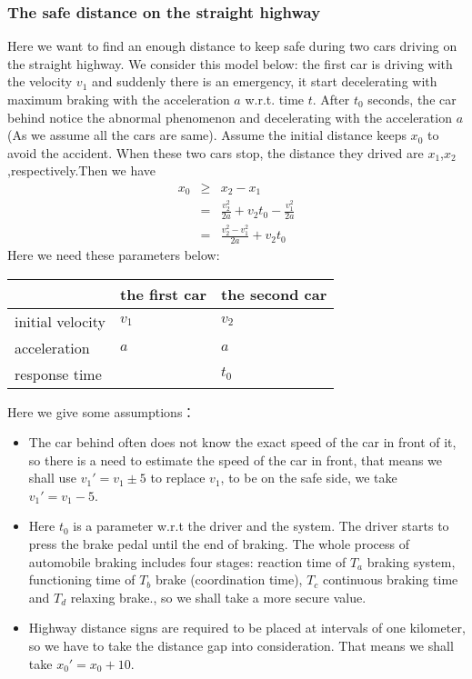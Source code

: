 \subsubsection{The safe distance on the straight highway}
Here we want to find an enough distance to keep safe during two cars driving on the straight highway. We consider this model below: the first car is driving with the velocity $v_1$ and suddenly there is  an emergency, it start decelerating with maximum braking with the acceleration $a$ w.r.t. time $t$. After $t_0$ seconds, the car behind notice the abnormal phenomenon and decelerating with the acceleration $a$(As we assume all the cars are same). Assume the initial distance keeps $x_0$ to avoid the accident. When these two cars stop, the distance they drived are $x_1$,$x_2$,respectively.Then we have
\begin{eqnarray}
x_0&\geq&x_2-x_1\nonumber \\
&=&\frac{v_2^2}{2a}+v_2t_0-\frac{v_1^2}{2a}\nonumber \\
&=&\frac{v_2^2-v_1^2}{2a}+v_2t_0
\end{eqnarray}
Here we need these parameters below:
\begin{table}[parameters]
	\begin{tabular}{|l|l|l|}
		\hline
		& the first car & the second car \\ \hline
		initial velocity & $v_1$          & $v_2$           \\ \hline
		acceleration     & $a$            & $a$              \\ \hline
		response time    & \diagbox       & $t_0$           \\ \hline
	\end{tabular}
\end{table}
Here we give some assumptions：
\begin{itemize}
	\item The car behind often does not know the exact speed of the car in front of it, so there is a need to estimate the speed of the car in front, that means we shall use $v_1'=v_1\pm5$ to replace $v_1$, to be on the safe side, we take $v_1'=v_1-5$.
	\item Here $t_0$ is a parameter w.r.t the driver and the system. The driver starts to press the brake pedal until the end of braking. The whole process of automobile braking includes four stages: reaction time of $T_a$ braking system, functioning time of $T_b$ brake (coordination time), $T_c$ continuous braking time and $T_d$ relaxing brake., so we shall take a more secure value.
	\item Highway distance signs are required to be placed at intervals of one kilometer, so we have to take the distance gap into consideration. That means we shall take $x_0'=x_0+10$.
\end{itemize}
